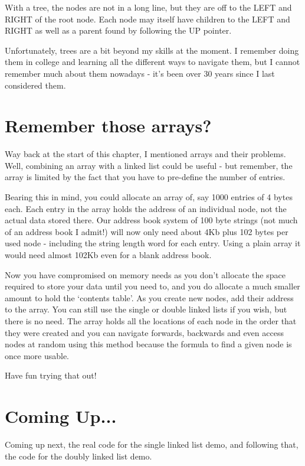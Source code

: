 With a tree, the nodes are not in a long line, but they are off to
      the LEFT and RIGHT of the root node. Each node may itself have children
      to the LEFT and RIGHT as well as a parent found by following the UP
      pointer.

Unfortunately, trees are a bit beyond my skills at the moment. I
      remember doing them in college and learning all the different ways to
      navigate them, but I cannot remember much about them nowadays -{} it's
      been over 30 years since I last considered them.

\section{Remember those arrays?}
\label{ch10-remember-arrays}%

Way back at the start of this chapter, I mentioned arrays and their
    problems. Well, combining an array with a linked list could be useful -{}
    but remember, the array is limited by the fact that you have to pre-{}define
    the number of entries.

Bearing this in mind, you could allocate an array of, say 1000
    entries of 4 bytes each. Each entry in the array holds the address of an
    individual node, not the actual data stored there. Our address book system
    of 100 byte strings (not much of an address book I admit!) will now only
    need about 4Kb plus 102 bytes per used node -{} including the string length
    word for each entry. Using a plain array it would need almost 102Kb even
    for a blank address book.

Now you have compromised on memory needs as you don't allocate the
    space required to store your data until you need to, and you do allocate a
    much smaller amount to hold the `contents table'. As you create new nodes,
    add their address to the array. You can still use the single or double
    linked lists if you wish, but there is no need. The array holds all the
    locations of each node in the order that they were created and you can
    navigate forwards, backwards and even access nodes at random using this
    method because the formula to find a given node is once more
    usable.

Have fun trying that out!

\section{Coming Up...}
\label{ch10-the-end}%

Coming up next, the real code for the single linked list demo, and
    following that, the code for the doubly linked list demo.

